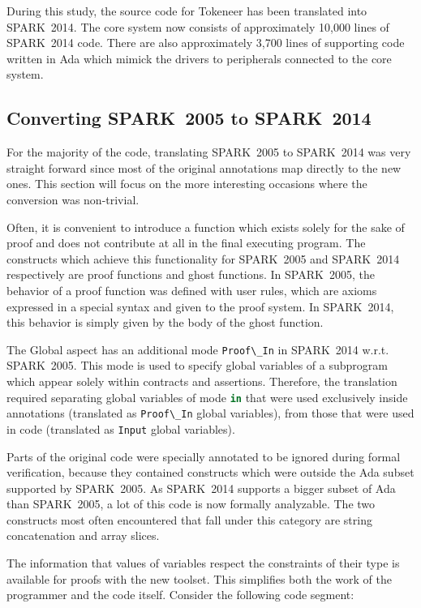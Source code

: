 \documentclass[10pt,a4paper,twocolumn]{article}
\newcommand{\oldspark}{SPARK~2005\xspace}
\newcommand{\newspark}{SPARK~2014\xspace}
\newcommand{\wrt}{w.r.t.\xspace}
\newcommand{\SPARK}[1]{\lstinline[language=Ada,basicstyle={\footnotesize
      \sffamily},framesep=0pt]$#1$}
\begin{document}
During this study, the source code for Tokeneer has been translated
into \newspark. The core system now consists of approximately 10,000
lines of \newspark code. There are also approximately 3,700 lines of
supporting code written in Ada which mimick the drivers to
peripherals connected to the core system.

\subsection{Converting \oldspark to \newspark}

For the majority of the code, translating \oldspark to \newspark was
very straight forward since most of the original annotations map
directly to the new ones. This section will focus on the more
interesting occasions where the conversion was non-trivial.

Often, it is convenient to introduce a function which exists
solely for the sake of proof and does not contribute at all in
the final executing program. The constructs which achieve this
functionality for \oldspark and \newspark respectively are proof
functions and ghost functions. In \oldspark, the behavior of a proof
function was defined with user rules, which are axioms expressed in a special
syntax and given to the proof system. In \newspark, this
behavior is simply given by the body of the ghost function.

The Global aspect has an additional mode \SPARK{Proof\_In} in \newspark \wrt
\oldspark. This mode is used to specify global variables of a subprogram which
appear solely within contracts and assertions. Therefore, the translation
required separating global variables of mode \SPARK{in} that were used
exclusively inside annotations (translated as \SPARK{Proof\_In} global
variables), from those that were used in code (translated as \SPARK{Input}
global variables).

Parts of the original code were specially annotated to be ignored during formal
verification, because they contained constructs which were outside the Ada
subset supported by \oldspark. As \newspark supports a bigger subset of Ada
than \oldspark, a lot of this code is now formally analyzable. The two
constructs most often encountered that fall under this category are string
concatenation and array slices.

The information that values of variables respect the constraints of their type
is available for proofs with the new toolset. This simplifies both the work of
the programmer and the code itself. Consider the following code segment:
\end{document}
